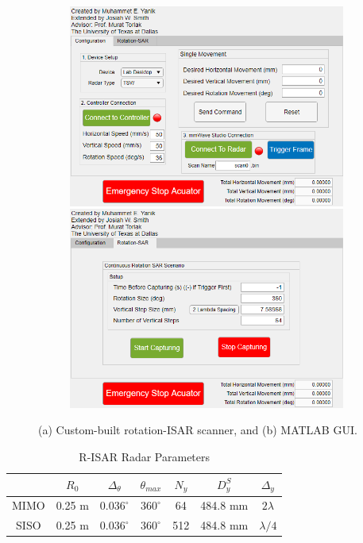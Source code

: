 \documentclass[conference]{IEEEtran}
\begin{document}
\begin{figure} [h]
\begin{subfigure}{.5\linewidth}
				\includegraphics[width=1\linewidth]{../Figures/MATLAB RSAR GUI 2}
				\caption{}
				\label{fig:matlab_gui}
			\end{subfigure}
			\caption{(a) Custom-built rotation-ISAR scanner, and (b) MATLAB GUI.}
		\end{figure}
	
		\begin{table} [h]
			\caption{\label{table_radar_parameters}R-ISAR Radar Parameters}
			\centering
			\begin{tabular}{c| c c c c c c}
				\hline
				& $R_0$ & $\Delta_\theta$ & $\theta_{max}$ & $N_y$ & $D^S_y$ & $\Delta_y$  \\ [0.5ex] 
				\hline\hline
				MIMO & 0.25 m & $0.036^{\circ}$ & $360^{\circ}$ & 64 & 484.8 mm  & $2\lambda$  \\ 
				\hline
				SISO & 0.25 m & $0.036^{\circ}$ & $360^{\circ}$ & 512 & 484.8 mm & $\lambda/4$ \\ 
				\hline
			\end{tabular}
		\end{table}
		
\end{document}
